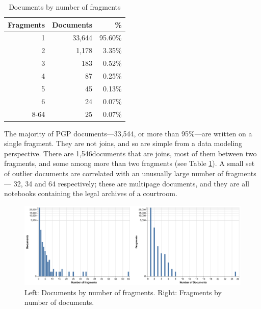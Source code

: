 \documentclass{article}
\def\singleFragmentDocuments{33,544}
\def\totalJoins{1,546}
\begin{document}
\begin{table}
\begin{center}
\caption{Documents by number of fragments}
\label{table:docs_per_numfrags}
\begin{tabular}{rrr}
\toprule
{Fragments} & {Documents} & {\%}\\
\midrule
1 & 33,644 & 95.60\% \\
2 & 1,178 & 3.35\% \\
3 & 183 & 0.52\% \\
4 & 87 & 0.25\% \\
5 & 45 & 0.13\% \\
6 & 24 & 0.07\% \\
8-64 & 25 & 0.07\% \\
\bottomrule
\end{tabular}
\end{center}
\end{table}

The majority of PGP documents—\singleFragmentDocuments, or more than 95\%—are written on a single fragment. They are not joins, and so are simple from a data modeling perspective. There are \totalJoins\space documents that are joins, most of them between two fragments, and some among more than two fragments (see Table \ref{table:docs_per_numfrags}). A small set of outlier documents are correlated with an unusually large number of fragments — 32, 34 and 64 respectively; these are multipage documents, and they are all notebooks containing the legal archives of a courtroom.


\begin{figure}[!hbt]
  \includegraphics[width=1.0\linewidth]{charts/docs_frags_2up.pdf}
  \centering
  \caption{Left: Documents by number of fragments. Right: Fragments by number of documents.}
  \label{fig:docs_per_num_frags}
\end{figure}

\end{document}
